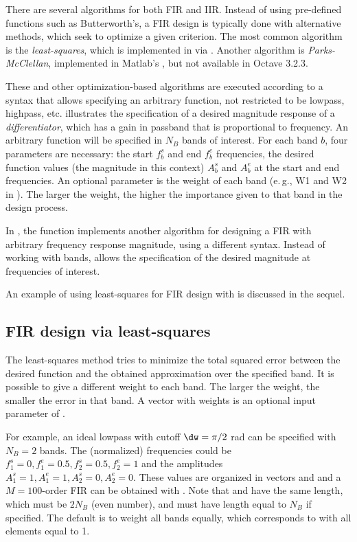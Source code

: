 There are several algorithms for both FIR and IIR.
Instead of using pre-defined functions such as Butterworth's, a FIR design is typically done with alternative methods, which seek to optimize a given criterion. The most common algorithm is the \emph{least-squares}, which is implemented in {\matlab} via . Another algorithm is \emph{Parks-McClellan}, implemented in Matlab's , but not available in Octave 3.2.3.

These and other optimization-based algorithms are executed according to a syntax that allows specifying an arbitrary function, not restricted to be lowpass, highpass, etc.
 illustrates the specification of a desired magnitude response of a \emph{differentiator}, which has a gain in passband that is proportional to frequency. 
An arbitrary function will be specified in $N_B$ bands of interest. For each band $b$, four parameters are necessary: the start $f_b^s$ and end $f_b^e$ frequencies, the desired function values  (the magnitude in this context) $A_b^s$ and $A_b^e$ at the start and end frequencies. An optional parameter is the weight of each band (e.\,g., W1 and W2 in ). The larger the weight, the higher the importance given to that band in the design process.

In {\matlab}, the function  implements another algorithm for designing a FIR with arbitrary frequency response magnitude, using a different syntax. Instead of working with bands,  allows the specification of the desired magnitude at frequencies of interest.

An example of using least-squares for FIR design with  is discussed in the sequel.

\subsection{FIR design via least-squares}

The least-squares method tries to minimize the total squared error between the desired function and the obtained approximation over the specified band. It is possible to give a different weight to each band. The larger the weight, the smaller the error in that band. A vector  with weights is an optional input parameter of .

For example, an ideal lowpass with cutoff $\dw=\pi/2$ rad can be specified with $N_B=2$ bands. The  (normalized) frequencies could be $f_1^s=0, f_1^e=0.5, f_2^s=0.5, f_2^e=1$ and the amplitudes $A_1^s=1, A_1^e=1, A_2^s=0, A_2^e=0$. These values are organized in vectors
 and  and a $M=100$-order FIR can be obtained with .
Note that  and  have the same length, which must be $2 N_B$ (even number), and   must have length equal to $N_B$ if specified. The default is to weight all bands equally, which corresponds to  with all elements equal to 1.

